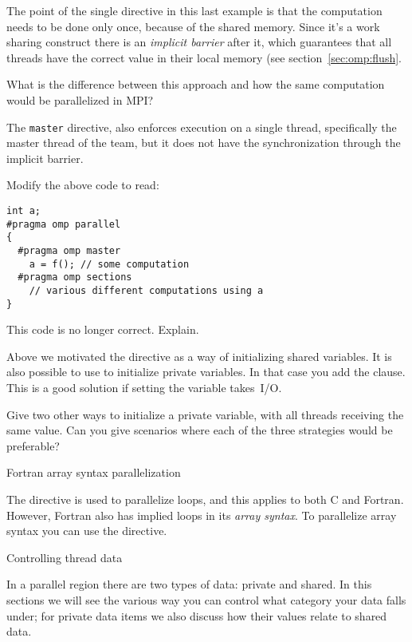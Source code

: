 The point of the single directive in this last example is that the
computation needs to be done only once, because of the shared memory.
Since it's a work sharing construct there is an \emph{implicit
  barrier} after it,
which guarantees that all threads have the correct value in their
local memory (see section~\ref{sec:omp:flush}.

\begin{exercise}
  What is the difference between this approach and how the same
  computation would be parallelized in MPI?
\end{exercise}

The \texttt{master} directive, also enforces execution
on a single thread, specifically the master thread of the team,
but it does not have the synchronization through the implicit barrier.

\begin{exercise}
  Modify the above code to read:
\begin{verbatim}
int a;
#pragma omp parallel
{
  #pragma omp master
    a = f(); // some computation
  #pragma omp sections
    // various different computations using a
}
\end{verbatim}
  This code is no longer correct. Explain.
\end{exercise}

Above we motivated the  directive as a way of initializing
shared variables. It is also possible to use  to initialize
private variables. In that case you add the 
clause. This is a good solution if setting the variable takes~I/O.

\begin{exercise}
  Give two other ways to initialize a private variable, with all
  threads receiving the same value. Can you give scenarios where each
  of the three strategies would be preferable?
\end{exercise}

 {Fortran array syntax parallelization}

The  directive is used to parallelize loops,
and this applies to both C and Fortran. However, Fortran also
has implied loops in its \emph{array syntax}.
To parallelize array syntax you can use the 
directive.

 {Controlling thread data}

In a parallel region there are two types of data: private and shared.
In this sections we will see the various way you can control what category
your data falls under; for private data items we also discuss how their values
relate to shared data.

